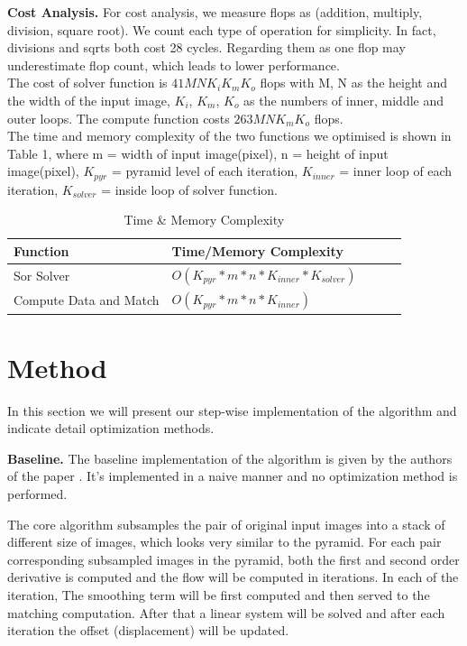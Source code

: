 \documentclass[letterpaper]{article}
\newcommand{\mypar}[1]{{\bf #1.}}
\begin{document}
\mypar{Cost Analysis}
For cost analysis, we measure flops as (addition, multiply, division, square root). We count each type of operation for simplicity. In fact, divisions and sqrts both cost 28 cycles. Regarding them as one flop may underestimate flop count, which leads to lower performance.\\
The cost of solver function is $41MNK_iK_mK_o$ flops with M, N as the height and the width of the input image, $K_i$, $K_m$, $K_o$ as the numbers of inner, middle and outer loops. The compute function costs $263MNK_mK_o$ flops.\\
The time and memory complexity of the two functions we optimised is shown in Table 1, where m = width of  input image(pixel), n = height of input image(pixel), $K_{pyr}$ = pyramid level of each iteration, $K_{inner}$ = inner loop of each iteration, $K_{solver}$ = inside loop of solver function.
\begin{table}[h]\centering
\footnotesize
\begin{tabular}{|l|l|l|l|l|}
\hline
 Function & Time/Memory Complexity\\ \hline
 Sor Solver & $O(K_{pyr} * m * n * K_{inner}* K_{solver})$ \\ \hline
 Compute Data and Match & $O(K_{pyr} * m * n * K_{inner})$ \\ \hline
\end{tabular}
\caption{Time \& Memory Complexity}
\end{table}

\section{Method}\label{sec:method}

In this section we will present our step-wise implementation of the 
algorithm and indicate detail optimization methods. 

\mypar{Baseline}
The baseline implementation of the algorithm is given by the authors 
of the paper \cite{Weinzaepfel:2013:DLD:2586117.2586991}. It's 
implemented in a naive manner and no optimization method is performed. 

The core algorithm subsamples the pair of original input images into 
a stack of different size of images, which looks very similar to the 
pyramid. For each pair corresponding subsampled images in the 
pyramid, both the first and second order derivative is computed and 
the flow will be computed in iterations. In each of the iteration, 
The smoothing term will be first computed and then served to the 
matching computation. After that a linear system will be solved and 
after each iteration the offset (displacement) will be updated. 
\end{document}
